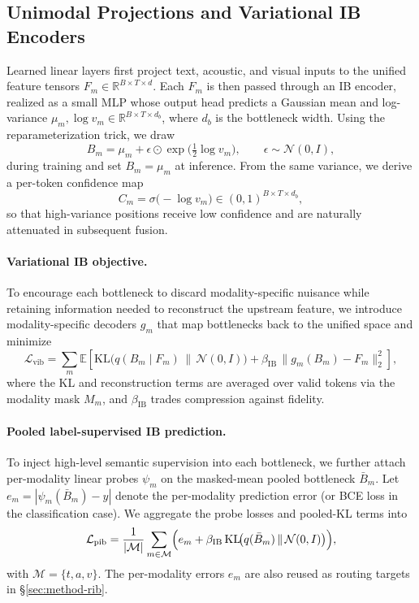 \subsection{Unimodal Projections and Variational IB Encoders}
\label{sec:method-ibenc}
Learned linear layers first project text, acoustic, and visual inputs to the
unified feature tensors $F_m \in \mathbb{R}^{B \times T \times d}$.
Each $F_m$ is then passed through an IB encoder, realized as a small MLP whose
output head predicts a Gaussian mean and log-variance
$\mu_m, \log v_m \in \mathbb{R}^{B \times T \times d_b}$, where $d_b$ is the
bottleneck width. Using the reparameterization trick, we draw
\begin{equation}
  B_m = \mu_m + \epsilon \odot \exp\!\bigl(\tfrac{1}{2}\log v_m\bigr),
  \qquad
  \epsilon \sim \mathcal{N}(0, I),
\end{equation}
during training and set $B_m = \mu_m$ at inference.
From the same variance, we derive a per-token confidence map
\begin{equation}
  C_m = \sigma\!\bigl(-\log v_m\bigr) \in (0, 1)^{B \times T \times d_b},
\end{equation}
so that high-variance positions receive low confidence and are naturally
attenuated in subsequent fusion.

\paragraph{Variational IB objective.}
To encourage each bottleneck to discard modality-specific nuisance while
retaining information needed to reconstruct the upstream feature, we introduce
modality-specific decoders $g_m$ that map bottlenecks back to the unified
space and minimize
\begin{equation}
  \mathcal{L}_{\mathrm{vib}}
  = \sum_{m}
    \mathbb{E}\!\left[
      \mathrm{KL}\!\bigl(q(B_m\mid F_m)\,\|\,\mathcal{N}(0,I)\bigr)
      + \beta_{\mathrm{IB}}\,\bigl\|g_m(B_m) - F_m\bigr\|_2^2
    \right],
\end{equation}
where the KL and reconstruction terms are averaged over valid tokens via the
modality mask $M_m$, and $\beta_{\mathrm{IB}}$ trades compression against
fidelity.

\paragraph{Pooled label-supervised IB prediction.}
To inject high-level semantic supervision into each bottleneck, we further
attach per-modality linear probes $\psi_m$ on the masked-mean pooled
bottleneck $\bar{B}_m$. Let $e_m = |\psi_m(\bar{B}_m) - y|$ denote the
per-modality prediction error (or BCE loss in the classification case).
We aggregate the probe losses and pooled-KL terms into
\begin{equation}
  \mathcal{L}_{\mathrm{pib}}
  = \frac{1}{|\mathcal{M}|}\sum_{m \in \mathcal{M}}
    \Bigl(e_m + \beta_{\mathrm{IB}}\,\mathrm{KL}\!\bigl(q(\bar{B}_m)\,\|\,\mathcal{N}(0,I)\bigr)\Bigr),
\end{equation}
with $\mathcal{M} = \{t, a, v\}$. The per-modality errors $e_m$ are also reused
as routing targets in \S\ref{sec:method-rib}.

